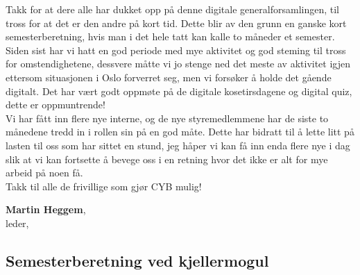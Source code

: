 \documentclass[10pt,norsk,a4paper]{article}
\begin{document}
\begin{multicols}{2}
Takk for at dere alle har dukket opp på denne digitale 
generalforsamlingen, til tross for at det er den andre 
på kort tid. Dette blir av den grunn en ganske kort 
semesterberetning, hvis man i det hele tatt kan kalle 
to måneder et semester.\\
Siden sist har vi hatt en god periode med mye aktivitet 
og god steming til tross for omstendighetene, dessvere 
måtte vi jo stenge ned det meste av aktivitet igjen 
ettersom situasjonen i Oslo forverret seg, men vi 
forsøker å holde det gående digitalt. Det har vært godt 
oppmøte på de digitale kosetirsdagene og digital quiz, 
dette er oppmuntrende!\\
Vi har fått inn flere nye interne, og de nye 
styremedlemmene har de siste to månedene tredd in i rollen 
sin på en god måte. Dette har bidratt til å lette litt 
på lasten til oss som har sittet en stund, jeg håper vi 
kan få inn enda flere nye i dag slik at vi kan fortsette 
å bevege oss i en retning hvor det ikke er alt for mye 
arbeid på noen få.\\

Takk til alle de frivillige som gjør CYB mulig!\\
\end{multicols}

\textbf{Martin Heggem}, \\
leder, \date{\emph{26. november 2020}}

\subsection{Semesterberetning ved kjellermogul}
\end{document}
